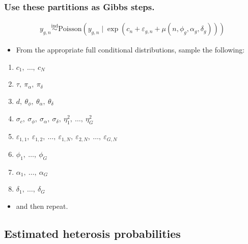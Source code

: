 \documentclass[handout]{beamer}
\providecommand{\e}{\varepsilon}
\numberwithin{equation}{section}
\begin{document}
\begin{frame}
\frametitle{Use these partitions as Gibbs steps.} \small

\begin{align*}
y_{g,n} \stackrel{\text{ind}}{\sim} \text{Poisson}(y_{g, n} \mid \exp(c_n + \e_{g, n} + \mu(n, \phi_g, \alpha_g, \delta_g)))
\end{align*}

\begin{itemize}
\item From the appropriate full conditional distributions, sample the following:
\end{itemize}


\begin{enumerate}
\item $c_1, \ \ldots, \ c_N$
\pause \item $\tau, \ \pi_\alpha, \ \pi_\delta$
\pause \item $d, \ \theta_\phi, \ \theta_\alpha, \ \theta_\delta$
\pause \item $\sigma_c, \ \sigma_\phi, \ \sigma_\alpha, \ \sigma_\delta, \ \eta_1^2, \ \ldots, \ \eta_G^2$
\pause \item $\e_{1, 1}, \ \e_{1, 2}, \ \ldots, \ \e_{1, N}, \ \e_{2, N}, \ \ldots, \ \e_{G, N}$
\pause \item $\phi_1, \ \ldots, \ \phi_G$
\pause \item $\alpha_1, \ \ldots, \ \alpha_G$
\pause \item $\delta_1, \ \ldots, \ \delta_G$
\end{enumerate}
\begin{itemize}
\item and then repeat.
\end{itemize}
\end{frame}

\subsection{Estimated heterosis probabilities}
\end{document}
